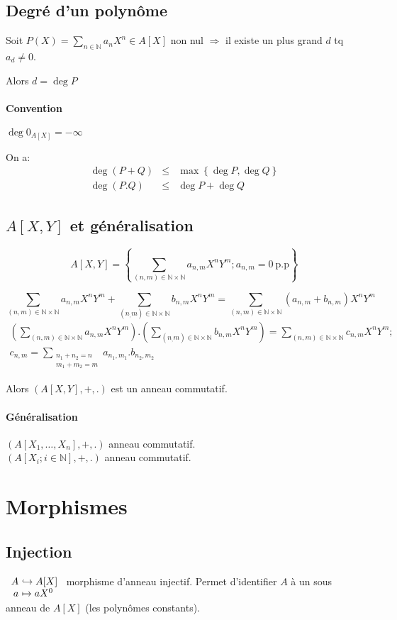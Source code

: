 \documentclass[reqno,a4paper,10pt]{report}
\newcommand{\set}[1]{\left\lbrace #1 \right\rbrace} %
\newcommand{\IN}{\ensuremath{\mathbb{N}}\xspace} %
\newcommand{\so}{\Rightarrow}
\newcommand{\inj}{\hookrightarrow}
\begin{document}
\subsection{Degré d'un polynôme}
Soit $P(X)=\sum_{n \in \IN } a_n X^n \in A[X]$ non nul $\so$ il existe un plus
grand $d$ tq $a_d \neq 0$.

Alors $d=\deg P$

\paragraph{Convention} $\deg 0_{A[X]} = -\infty$

On a:
\begin{eqnarray*}
\deg (P+Q) &\leq& \max \set{\deg P, \deg Q}\\
\deg (P.Q) &\leq& \deg P + \deg Q
\end{eqnarray*}

\subsection{$A[X, Y]$ et généralisation}
\[A[X, Y] = \set{\sum_{(n,m) \in \IN \times \IN} a_{n,m} X^n Y^m; a_{n,m} = 0
\ \text{p.p}}\]

\[\sum_{(n,m) \in \IN \times \IN} a_{n,m} X^n Y^m + \sum_{(n_,m) \in \IN
\times \IN} b_{n,m} X^n Y^m = \sum_{(n,m) \in \IN \times \IN} (a_{n,m} +
b_{n,m}) X^n Y^m\]
\begin{multline*}
\left(\sum_{(n,m) \in \IN \times \IN} a_{n,m} X^n Y^m\right)
. \left(\sum_{(n_,m) \in \IN \times \IN} b_{n,m} X^n Y^m\right) = \sum_{(n,m)
\in \IN \times \IN} c_{n,m} X^n Y^m ; \\
c_{n,m} = \sum_{\substack{ n_1+n_2 =n\\
  m_1 + m_2 = m} } a_{n_1,m_1} . b_{n_2, m_2}
\end{multline*}

Alors $\left( A[X,Y], +, . \right)$ est un anneau commutatif.

\paragraph{Généralisation} $(A[X_1, \dots, X_n], +, .)$ anneau commutatif.\\
$(A[X_i; i\in \IN], +, .)$ anneau commutatif.

\section{Morphismes}
\subsection{Injection}
$\begin{array}[t]{r@{\ }l}
  A  &\inj A[X]\\
  a &\mapsto a X^0
\end{array}$
morphisme d'anneau injectif. Permet d'identifier $A$ à un sous anneau de
$A[X]$ (les polynômes constants).
\end{document}
